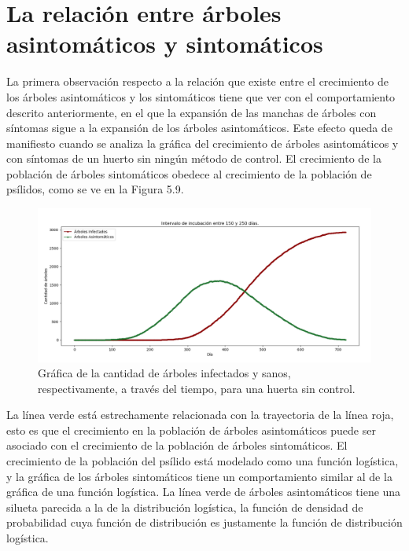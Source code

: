 \section{La relación entre árboles asintomáticos y sintomáticos}
La primera observación respecto a la relación que existe entre el crecimiento de los árboles asintomáticos y los sintomáticos tiene que ver con el comportamiento descrito anteriormente, en el que la expansión de las manchas de árboles con síntomas sigue a la expansión de los árboles asintomáticos. Este efecto queda de manifiesto cuando se analiza la gráfica del crecimiento de árboles asintomáticos y con síntomas de un huerto sin ningún método de control. El crecimiento de la población de árboles sintomáticos obedece al crecimiento de la población de psílidos, como se ve en la Figura 5.9.
\begin{figure}[H]
\centering
\includegraphics[width=1\textwidth,keepaspectratio=true]{images/Imágenes C6/C6-8.png}
\caption{Gráfica de la cantidad de árboles infectados y sanos, respectivamente, a través del tiempo, para una huerta sin control.}
\end{figure}
La línea verde está estrechamente relacionada con la trayectoria de la línea roja, esto es que el crecimiento en la población de árboles asintomáticos puede ser asociado con el crecimiento de la población de árboles sintomáticos. El crecimiento de la población del psílido está modelado como una función logística, y la gráfica de los árboles sintomáticos tiene un comportamiento similar al de la gráfica de una función logística. La línea verde de árboles asintomáticos tiene una silueta parecida a la de la distribución logística, la función de densidad de probabilidad cuya función de distribución es justamente la función de distribución logística.

